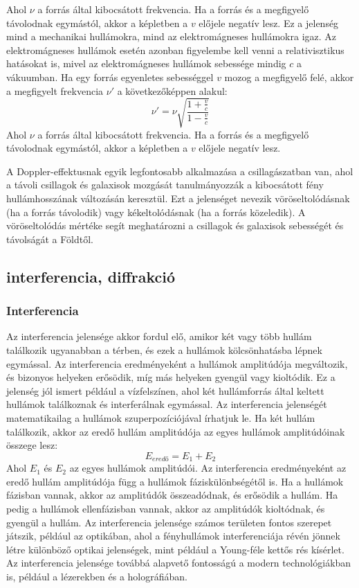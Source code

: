 \documentclass[a4paper,12pt]{article}
\begin{document}
Ahol $\nu$ a forrás által kibocsátott frekvencia. Ha a forrás és a megfigyelő távolodnak egymástól, akkor a képletben a $v$ előjele negatív lesz.
Ez a jelenség mind a mechanikai hullámokra, mind az elektromágneses hullámokra igaz. Az elektromágneses hullámok esetén azonban figyelembe kell venni a relativisztikus hatásokat is, mivel az elektromágneses hullámok sebessége mindig $c$ a vákuumban. Ha egy forrás egyenletes sebességgel $v$ mozog a megfigyelő felé, akkor a megfigyelt frekvencia $\nu'$ a következőképpen alakul:
\begin{equation}
    \nu' = \nu \sqrt{\frac{1 + \frac{v}{c}}{1 - \frac{v}{c}}}
\end{equation}
Ahol $\nu$ a forrás által kibocsátott frekvencia. Ha a forrás és a megfigyelő távolodnak egymástól, akkor a képletben a $v$ előjele negatív lesz.

A Doppler-effektusnak egyik legfontosabb alkalmazása a csillagászatban van, ahol a távoli csillagok és galaxisok mozgását tanulmányozzák a kibocsátott fény hullámhosszának változásán keresztül.
Ezt a jelenséget nevezik vöröseltolódásnak (ha a forrás távolodik) vagy kékeltolódásnak (ha a forrás közeledik). A vöröseltolódás mértéke segít meghatározni a csillagok és galaxisok sebességét és távolságát a Földtől.

\subsection{interferencia, diffrakció}
\subsubsection{Interferencia}
Az interferencia jelensége akkor fordul elő, amikor két vagy több hullám találkozik ugyanabban a térben, és ezek a hullámok kölcsönhatásba lépnek egymással.
Az interferencia eredményeként a hullámok amplitúdója megváltozik, és bizonyos helyeken erősödik, míg más helyeken gyengül vagy kioltódik. Ez a jelenség jól ismert például a vízfelszínen, ahol két hullámforrás által keltett hullámok találkoznak és interferálnak egymással.
Az interferencia jelenségét matematikailag a hullámok szuperpozíciójával írhatjuk le. Ha két hullám találkozik, akkor az eredő hullám amplitúdója az egyes hullámok amplitúdóinak összege lesz:
\begin{equation}
    E_{eredő} = E_1 + E_2
\end{equation}
Ahol $E_1$ és $E_2$ az egyes hullámok amplitúdói. Az interferencia eredményeként az eredő hullám amplitúdója függ a hullámok fáziskülönbségétől is. Ha a hullámok fázisban vannak, akkor az amplitúdók összeadódnak, és erősödik a hullám. Ha pedig a hullámok ellenfázisban vannak, akkor az amplitúdók kioltódnak, és gyengül a hullám.
Az interferencia jelensége számos területen fontos szerepet játszik, például az optikában, ahol a fényhullámok interferenciája révén jönnek létre különböző optikai jelenségek, mint például a Young-féle kettős rés kísérlet.
Az interferencia jelensége továbbá alapvető fontosságú a modern technológiákban is, például a lézerekben és a holográfiában.
\end{document}
